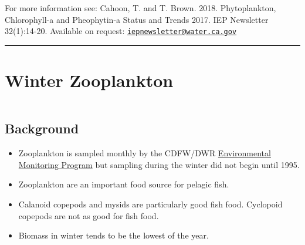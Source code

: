 \documentclass[
]{book}
\providecommand{\tightlist}{%
  \setlength{\itemsep}{0pt}\setlength{\parskip}{0pt}}
\begin{document}
\begin{disclaimer}
For more information see: Cahoon, T. and T. Brown. 2018. Phytoplankton,
Chlorophyll-a and Pheophytin-a Status and Trends 2017. IEP Newsletter
32(1):14-20. Available on request:
\href{mailto:iepnewsletter@water.ca.gov}{\nolinkurl{iepnewsletter@water.ca.gov}}
\end{disclaimer}

\begin{center}\rule{0.5\linewidth}{0.5pt}\end{center}

\hypertarget{winter-zooplankton}{%
\section{Winter Zooplankton}\label{winter-zooplankton}}

\begin{column}{0.7\textwidth}
\hypertarget{background-21}{%
\subsection{Background}\label{background-21}}

\begin{itemize}
\tightlist
\item
  Zooplankton is sampled monthly by the CDFW/DWR \href{https://emp.baydeltalive.com/wiki/12297}{Environmental Monitoring Program} but sampling during the winter did not begin until 1995.
\item
  Zooplankton are an important food source for pelagic fish.
\item
  Calanoid copepods and mysids are particularly good fish food. Cyclopoid copepods are not as good for fish food.
\item
  Biomass in winter tends to be the lowest of the year.
\end{itemize}
\end{column}
\end{document}
